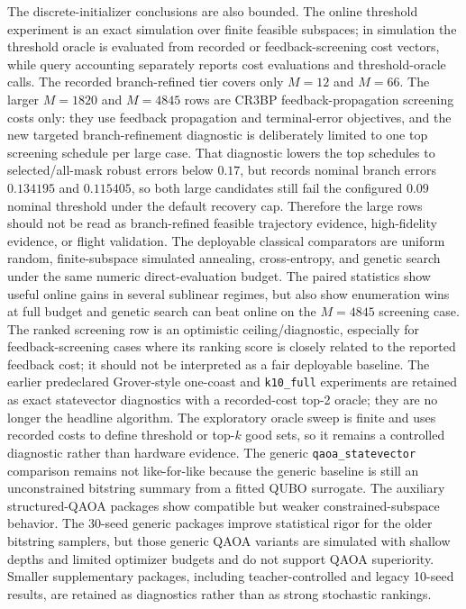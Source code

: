 \documentclass[preprint,12pt]{elsarticle}
\begin{document}
The discrete-initializer conclusions are also bounded. The online threshold experiment is an exact simulation over finite feasible subspaces; in simulation the threshold oracle is evaluated from recorded or feedback-screening cost vectors, while query accounting separately reports cost evaluations and threshold-oracle calls. The recorded branch-refined tier covers only $M=12$ and $M=66$. The larger $M=1820$ and $M=4845$ rows are CR3BP feedback-propagation screening costs only: they use feedback propagation and terminal-error objectives, and the new targeted branch-refinement diagnostic is deliberately limited to one top screening schedule per large case. That diagnostic lowers the top schedules to selected/all-mask robust errors below $0.17$, but records nominal branch errors $0.134195$ and $0.115405$, so both large candidates still fail the configured $0.09$ nominal threshold under the default recovery cap. Therefore the large rows should not be read as branch-refined feasible trajectory evidence, high-fidelity evidence, or flight validation. The deployable classical comparators are uniform random, finite-subspace simulated annealing, cross-entropy, and genetic search under the same numeric direct-evaluation budget. The paired statistics show useful online gains in several sublinear regimes, but also show enumeration wins at full budget and genetic search can beat online on the $M=4845$ screening case. The ranked screening row is an optimistic ceiling/diagnostic, especially for feedback-screening cases where its ranking score is closely related to the reported feedback cost; it should not be interpreted as a fair deployable baseline. The earlier predeclared Grover-style one-coast and \texttt{k10\_full} experiments are retained as exact statevector diagnostics with a recorded-cost top-2 oracle; they are no longer the headline algorithm. The exploratory oracle sweep is finite and uses recorded costs to define threshold or top-$k$ good sets, so it remains a controlled diagnostic rather than hardware evidence. The generic \texttt{qaoa\_statevector} comparison remains not like-for-like because the generic baseline is still an unconstrained bitstring summary from a fitted QUBO surrogate. The auxiliary structured-QAOA packages show compatible but weaker constrained-subspace behavior. The 30-seed generic packages improve statistical rigor for the older bitstring samplers, but those generic QAOA variants are simulated with shallow depths and limited optimizer budgets and do not support QAOA superiority. Smaller supplementary packages, including teacher-controlled and legacy 10-seed results, are retained as diagnostics rather than as strong stochastic rankings.
\end{document}
